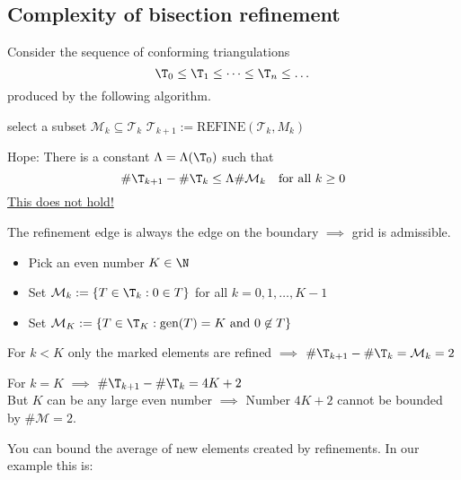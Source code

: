 \begin{enumerate}[label = \alph*)]
		\subsection{Complexity of bisection refinement}
		Consider the sequence of conforming triangulations 
		\begin{equation*}
			\T_{0} \leq \T_{1} \leq \dots \leq \T_{n} \leq \dots 
		\end{equation*}
		produced by the following algorithm.
    \begin{algorithmic}
    \State select a subset $\mathcal{M}_k \subseteq \mathcal{T}_k$
        \State $\mathcal{T}_{k + 1} := \text{REFINE}(\mathcal{T}_k, M_k)$
      \EndFor
    \end{algorithmic}
		Hope: There is a constant $\Lambda = \Lambda(\T_{0})$ such that 
		\begin{equation*}
      \#\T_{k+1} - \#\T_{k} \leq \Lambda \# \mathcal{M}_{k} \quad \text{for all } k \geq 0
		\end{equation*}
		\underline{This does not hold!}
    \begin{example}[Counterexample] \label{ex:counterexampleRefinementBoundary}
      The refinement edge is always the edge on the boundary $\implies$ grid is admissible.
      
      \begin{itemize}
        \item Pick an even number $K \in \N$ 
        \item Set $\mathcal{M}_{k} := \left\{ T \in \T_{k}: 0 \in T \right\} $ for all $k=0,1,\dots ,K-1$ 
          
        \item Set $\mathcal{M}_{K} := \left\{ T \in \T_{K}: \text{gen}(T)=K \text{ and } 0 \not\in T \right\}$ 
          
      \end{itemize}
      For $k < K$ only the marked elements are refined $\implies$ $\#\T_{k+1} - \#\T_{k} = \mathcal{M}_{k} = 2$	
      
      
      For $k=K$ $\implies$ $\#\T_{k+1} - \#\T_{k} = 4K +2$\\
      But $K$ can be any large even number $\implies$ Number $4K +2$ cannot be bounded by $\#\mathcal{M}=2$.
    \end{example} %
		You can bound the average of new elements created by refinements.
    In our example this is:

\end{enumerate}
